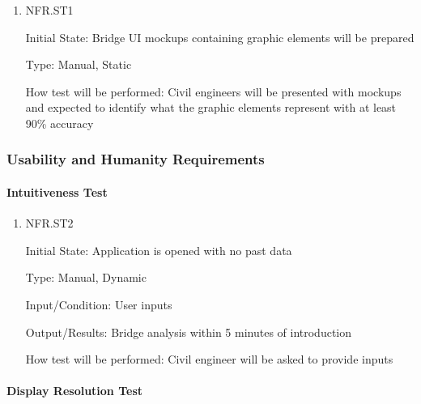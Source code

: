 \documentclass[12pt, titlepage]{article}
\begin{document}
\begin{enumerate}

\item{NFR.ST1\\}

Initial State: Bridge UI mockups containing graphic elements will be prepared

Type: Manual, Static

How test will be performed: Civil engineers will be presented with mockups and expected to identify what the graphic elements represent with at least 90\% accuracy

\end{enumerate}

\subsubsection{Usability and Humanity Requirements}
		
\paragraph{Intuitiveness Test}

\begin{enumerate}

\item{NFR.ST2\\}

Initial State: Application is opened with no past data

Type: Manual, Dynamic

Input/Condition: User inputs

Output/Results: Bridge analysis within 5 minutes of introduction

How test will be performed: Civil engineer will be asked to provide inputs

\end{enumerate}
		
\paragraph{Display Resolution Test}
\end{document}
